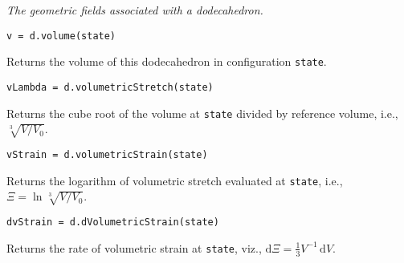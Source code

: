 \medskip\noindent
\textit{The geometric fields associated with a dodecahedron.}

\medskip\noindent
\texttt{v = d.volume(state)}

\medskip\noindent
Returns the volume of this dodecahedron in configuration \texttt{state}.

\medskip\noindent
\texttt{vLambda = d.volumetricStretch(state)}

\medskip\noindent
Returns the cube root of the volume at \texttt{state} divided by reference volume, i.e., $\sqrt[3]{V / V_0}$.

\medskip\noindent
\texttt{vStrain = d.volumetricStrain(state)}

\medskip\noindent
Returns the logarithm of volumetric stretch evaluated at \texttt{state}, i.e., $\Xi = \ln \sqrt[3]{V / V_0}$.

\medskip\noindent
\texttt{dvStrain = d.dVolumetricStrain(state)}

\medskip\noindent
Returns the rate of volumetric strain at \texttt{state}, viz., $\mathrm{d} \Xi = \tfrac{1}{3} V^{-1} \, \mathrm{d} V$.
